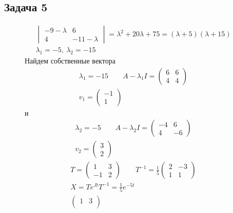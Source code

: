 \subsection*{Задача 5}
\begin{figure}[!h]
	\begin{minipage}[h]{0.49\linewidth}
		\begin{gather*}
			\begin{vmatrix}
				-9 - \lambda & 6\\
				4 & -11 - \lambda
			\end{vmatrix}
			= 
			\lambda^2 + 20\lambda + 75
			=
			\left(\lambda + 5\right)\left(\lambda + 15\right)\\
			\lambda_1 = -5,\ \lambda_2 = -15
		\end{gather*}
		Найдем собственные вектора
		\begin{gather*}
			\lambda_1 = -15\qquad
			A - \lambda_1 I =
			\begin{pmatrix}
				6 & 6\\
				4 & 4
			\end{pmatrix}\\
			v_1 =
			\begin{pmatrix}
				-1 \\ 1
			\end{pmatrix}
		\end{gather*}
		и
		\begin{gather*}
			\lambda_2 = -5\qquad
			A - \lambda_2 I =
			\begin{pmatrix}
				-4 & 6\\
				4 & -6
			\end{pmatrix}\\
			v_2 =
			\begin{pmatrix}
				3 \\ 2
			\end{pmatrix}
		\end{gather*}
		\begin{gather*}
			T = 
			\begin{pmatrix}
				1 & 3\\
				-1 & 2
			\end{pmatrix}\qquad
			T^{-1} = \frac{1}{5}
			\begin{pmatrix}
				2 & -3\\
				1 & 1
			\end{pmatrix}\\
			X = T e^{Jt} T^{-1} = \frac{1}{5} e^{-5t}\\
			\begin{pmatrix}
				1 & 3\\

\end{pmatrix}
\end{gather*}
\end{minipage}
\end{figure}
